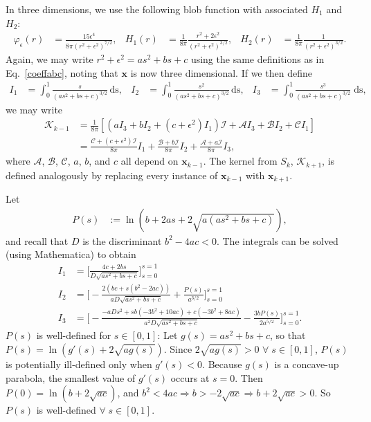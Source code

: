 \documentclass[12pt]{article}
\newcommand{\bx}{\mathbf{x}}
\newcommand{\vphie}{\varphi_{\epsilon}}
\newcommand{\eps}{\epsilon}
\newcommand{\baas}[1]{\begin{align*} #1 \end{align*}}
\begin{document}
In three dimensions, we use the following blob function with associated $H_1$ and $H_2$:
\baas{
\vphie(r) &= \frac{15\eps^4}{8\pi(r^2+\eps^2)^{7/2}}, & H_1(r) &= \frac{1}{8\pi}\frac{r^2 + 2\eps^2}{\left( r^2 + \eps^2\right)^{3/2}}, & H_2(r) &= \frac{1}{8\pi}\frac{1}{\left( r^2 + \eps^2\right)^{3/2}}.
}
Again, we may write $r^2 + \eps^2 = as^2 + bs +c$ using the same definitions as in Eq.~\eqref{coeffabc}, noting that $\bx$ is now three dimensional. If we then define 	%
\baas{
	I_{1} &= \int_0^1   \frac{s}{\left(as^2 + bs +c\right)^{3/2}}\,\text{ds}, & I_{2} &= \int_0^1 \frac{s^2}{\left(as^2 + bs +c\right)^{3/2}}\,\text{ds}, & I_{3} &= \int_0^1 \frac{s^3}{\left(as^2 + bs +c\right)^{3/2}}\;\text{ds},
}
we may write
\baas{
\mathcal{K}_{k-1} & = \frac{1}{8\pi}\left[\left(aI_3 + bI_2 + (c+\eps^2) I_1\right)\mathcal{I} + \mathcal{A} I_3 +  \mathcal{B} I_2 +  \mathcal{C} I_1 \right]\\
 & = \frac{\mathcal{C} + (c + \eps^2)\mathcal{I}}{8\pi}I_1 + \frac{\mathcal{B} + b\mathcal{I}}{8\pi} I_2 + \frac{\mathcal{A} + a\mathcal{I}}{8\pi} I_3,
}	
where $\mathcal{A}$, $\mathcal{B}$, $\mathcal{C}$, $a$, $b$, and $c$ all depend on $\bx_{k-1}$. The kernel from $S_k$, $\mathcal{K}_{k+1}$, is defined analogously by replacing every instance of $\bx_{k-1}$ with $\bx_{k+1}$. 

Let
\baas{
P(s) & :=  \ln \left( b+2as+2\sqrt{a(as^2 + bs +c)} \right),
}
and recall that $D$ is the discriminant $b^2 - 4ac < 0$. The integrals can be solved (using Mathematica) to obtain
\baas{
	I_{1} &= \Bigg[\frac{4c+2bs}{D \sqrt{as^2 + bs +c}}\Bigg]_{s=0}^{s=1} \\
	I_{2} &= \Bigg[-\frac{2(bc + s(b^2 -2ac))}{aD \sqrt{as^2 + bs +c}} + \frac{P(s)}{a^{3/2}}\Bigg]_{s=0}^{s=1}   \\
	I_{3} &= \Bigg[-\frac{ -aDs^2 + sb(-3b^2 + 10ac) + c(-3b^2 + 8ac) }{ a^2D \sqrt{as^2 + bs +c} } - \frac{3bP(s) } { 2a^{5/2} } \Bigg]_{s=0}^{s=1}.
}
$P(s)$ is well-defined for $s \in [0,1]$: Let $g(s) = as^2 + bs +c$, so that $P(s) = \ln( g'(s)+2\sqrt{ag(s)})$. Since $2\sqrt{ag(s)} > 0$  $ \forall \; s \in [0,1]$, $P(s)$ is potentially ill-defined only when $g'(s) < 0$. Because $g(s)$ is a concave-up parabola, the smallest value of $g'(s)$ occurs at $s=0$. Then $P(0) = \ln \left( b+2\sqrt{ac} \right)$, and $b^2 < 4ac \Rightarrow  b > -2\sqrt{ac} \Rightarrow b + 2\sqrt{ac}>0$. So $P(s)$ is well-defined $\forall \; s \in [0,1]$.
\end{document}
